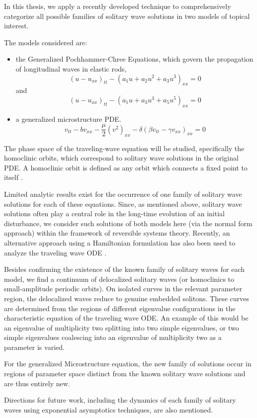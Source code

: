 In this thesis, we apply a recently developed technique to
comprehensively categorize all possible families of solitary wave
solutions in two models of topical interest.

The models considered are:
\begin{itemize}
\item the Generalized Pochhammer-Chree Equations, which  govern the
propagation of longitudinal waves in elastic rods,
\begin{equation}\label{eq:GPC1}
\left( u - u_{xx} \right)_{tt} - \left( a_1 u + a_2 u^2 + a_3 u^3 \right)_{xx} =0  
\end{equation}
and
\begin{equation}  \label{eq:GPC2} 
\left( u - u_{xx} \right)_{tt} - \left( a_1 u + a_3 u^3 + a_5 u^5 \right)_{xx} =0
\end{equation}

\item a generalized microstructure PDE.
\begin{equation}\label{eq:MS}
v_{tt} - b v_{xx} - \frac{\mu}{2} \left( v^2 \right)_{xx} - \delta \left( \beta v_{tt} - \gamma v_{xx}\right)_{xx} = 0 
\end{equation}
\end{itemize}

The phase space of the traveling-wave equation will be studied, specifically the
homoclinic orbits, which correspond to solitary wave solutions in the original
PDE. A homoclinic orbit is defined as any orbit which connects a fixed point to
itself \cite{Strogatz}.

Limited analytic results exist for the occurrence of one family
of  solitary wave solutions for each of these equations. Since, as
mentioned above, solitary wave solutions often play a central role in
the long-time evolution of an initial disturbance, we consider
such solutions of both models here (via the normal form approach)
within the framework of reversible systems theory. Recently, an
alternative approach using a Hamiltonian formulation has also
been used to analyze the traveling wave ODE \cite{LiZhang}.

Besides confirming the existence of the known family of solitary waves for each
model, we find a continuum of delocalized solitary waves (or homoclinics to
small-amplitude periodic orbits).  On isolated curves in the relevant parameter
region, the delocalized waves reduce to genuine embedded solitons.  These curves
are determined from the regions of different eigenvalue configurations in the
characteristic equation of the traveling wave ODE. An example of this
would be an eigenvalue of multiplicity two splitting into two simple eigenvalues,
or two simple eigenvalues coalescing into an eigenvalue of multiplicity two
as a parameter is varied.

For the generalized Microstructure equation, the new family of solutions occur
in regions of parameter space distinct from the known solitary wave solutions
and are thus entirely new.

Directions for future work, including the dynamics of each family of
solitary waves using exponential asymptotics techniques, are also mentioned.


